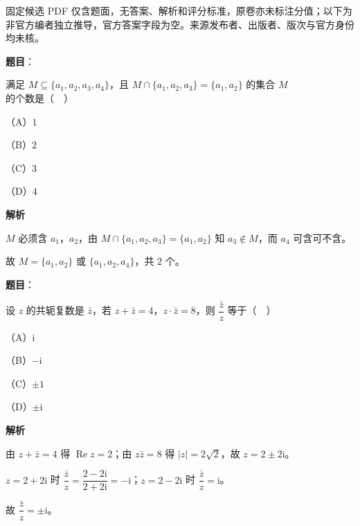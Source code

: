 

\begin{gktip}
固定候选 PDF 仅含题面，无答案、解析和评分标准，原卷亦未标注分值；以下为非官方编者独立推导，官方答案字段为空。来源发布者、出版者、版次与官方身份均未核。
\end{gktip}

\begin{answer}

\textbf{题目}：

满足 $M\subseteq\{a_1,a_2,a_3,a_4\}$，且 $M\cap\{a_1,a_2,a_3\}=\{a_1,a_2\}$ 的集合 $M$ 的个数是（　）

（A）$1$

（B）$2$

（C）$3$

（D）$4$

\textbf{解析}

$M$ 必须含 $a_1$，$a_2$，由 $M\cap\{a_1,a_2,a_3\}=\{a_1,a_2\}$ 知 $a_3\notin M$，而 $a_4$ 可含可不含。

故 $M=\{a_1,a_2\}$ 或 $\{a_1,a_2,a_4\}$，共 $2$ 个。


\end{answer}
\begin{answer}

\textbf{题目}：

设 $z$ 的共轭复数是 $\bar z$，若 $z+\bar z=4$，$z\cdot\bar z=8$，则 $\dfrac{\bar z}{z}$ 等于（　）

（A）$\mathrm i$

（B）$-\mathrm i$

（C）$\pm1$

（D）$\pm\mathrm i$

\textbf{解析}

由 $z+\bar z=4$ 得 $\operatorname{Re}z=2$；由 $z\bar z=8$ 得 $|z|=2\sqrt2$，故 $z=2\pm2\mathrm i$。

$z=2+2\mathrm i$ 时 $\dfrac{\bar z}z=\dfrac{2-2\mathrm i}{2+2\mathrm i}=-\mathrm i$；$z=2-2\mathrm i$ 时 $\dfrac{\bar z}z=\mathrm i$。

故 $\dfrac{\bar z}z=\pm\mathrm i$。


\end{answer}
